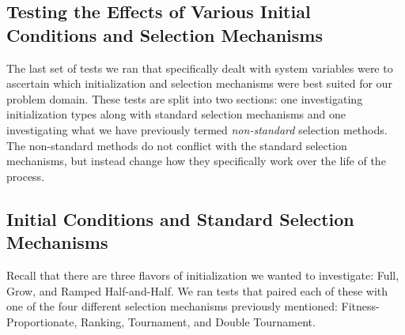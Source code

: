 \documentclass[a4paper,12pt]{report} 	%
\numberwithin{figure}{chapter}
\numberwithin{table}{chapter}
\numberwithin{equation}{chapter}
\begin{document}
\begin{flushleft}
\section{Testing the Effects of Various Initial Conditions and Selection Mechanisms}
The last set of tests we ran that specifically dealt with system variables were to ascertain which initialization and selection mechanisms were best suited for our problem domain. These tests are split into two sections: one investigating initialization types along with standard selection mechanisms and one investigating what we have previously termed \emph{non-standard} selection methods. The non-standard methods do not conflict with the standard selection mechanisms, but instead change how they specifically work over the life of the process.

\subsection{Initial Conditions and Standard Selection Mechanisms}

Recall that there are three flavors of initialization we wanted to investigate: Full, Grow, and Ramped Half-and-Half. We ran tests that paired each of these with one of the four different selection mechanisms previously mentioned: Fitness-Proportionate, Ranking, Tournament, and Double Tournament.


\end{flushleft}
\end{document}
